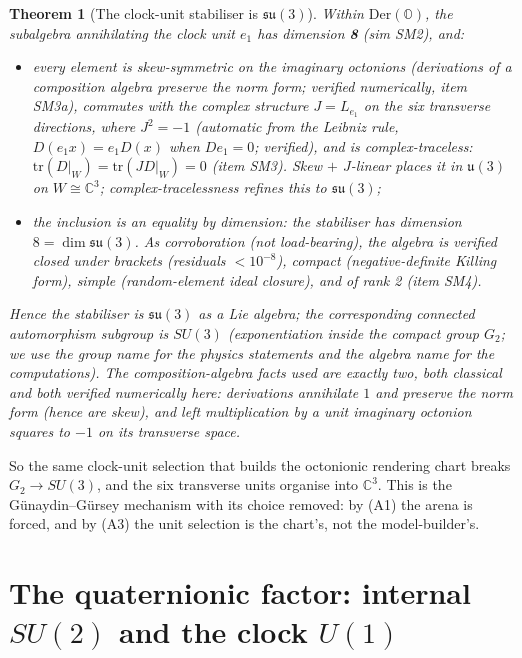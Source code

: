 \documentclass[12pt]{article}
\newtheorem{theorem}{Theorem}
\theoremstyle{definition}
\theoremstyle{remark}
\newcommand{\Oc}{\mathbb{O}}
\begin{document}
\begin{theorem}[The clock-unit stabiliser is $\mathfrak{su}(3)$]\label{thm:su3}
Within $\mathrm{Der}(\Oc)$, the subalgebra annihilating the clock unit $e_1$ has dimension \textbf{8} (sim SM2), and:
\begin{itemize}
\item[(i)] every element is skew-symmetric on the imaginary octonions (derivations of a composition algebra preserve the norm form; verified numerically, item SM3a), commutes with the complex structure $J = L_{e_1}$ on the six transverse directions, where $J^2 = -1$ (automatic from the Leibniz rule, $D(e_1x) = e_1D(x)$ when $De_1 = 0$; verified), and is complex-traceless: $\mathrm{tr}(D|_W) = \mathrm{tr}(JD|_W) = 0$ (item SM3). Skew $+$ $J$-linear places it in $\mathfrak u(3)$ on $W \cong \mathbb C^3$; complex-tracelessness refines this to $\mathfrak{su}(3)$;
\item[(ii)] the inclusion is an equality by dimension: the stabiliser has dimension $8 = \dim\mathfrak{su}(3)$. As corroboration (not load-bearing), the algebra is verified closed under brackets (residuals $<10^{-8}$), compact (negative-definite Killing form), simple (random-element ideal closure), and of rank 2 (item SM4).
\end{itemize}
Hence the stabiliser \emph{is} $\mathfrak{su}(3)$ as a Lie algebra; the corresponding connected automorphism subgroup is $SU(3)$ (exponentiation inside the compact group $G_2$; we use the group name for the physics statements and the algebra name for the computations). The composition-algebra facts used are exactly two, both classical and both verified numerically here: derivations annihilate $1$ and preserve the norm form (hence are skew), and left multiplication by a unit imaginary octonion squares to $-1$ on its transverse space.
\end{theorem}

So the same clock-unit selection that builds the octonionic rendering chart breaks $G_2 \to SU(3)$, and the six transverse units organise into $\mathbb C^3$. This is the G\"unaydin--G\"ursey mechanism with its choice removed: by (A1) the arena is forced, and by (A3) the unit selection is the chart's, not the model-builder's.

\section{The quaternionic factor: internal $SU(2)$ and the clock $U(1)$}\label{sec:su2}
\end{document}
